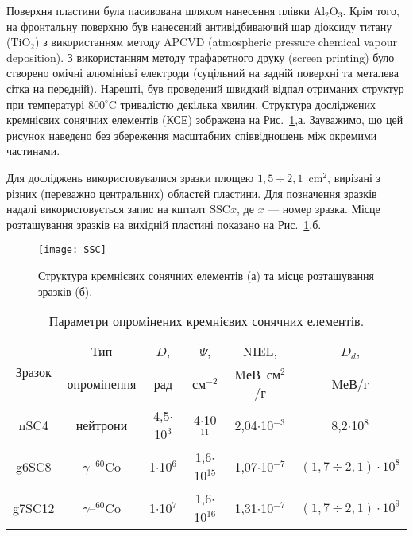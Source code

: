 Поверхня пластини була пасивована шляхом нанесення плівки Al$_2$O$_3$.
Крім того, на фронтальну поверхню був нанесений антивідбиваючий шар діоксиду титану (TiO$_2$) з використанням методу APCVD (atmospheric pressure chemical  vapour  deposition).
З використанням методу трафаретного друку (screen printing) було створено омічні алюмінієві електроди (суцільний на задній поверхні та металева сітка на передній).
Нарешті, був проведений швидкий відпал отриманих структур при температурі $800^\circ$C тривалістю декілька хвилин.
Структура досліджених кремнієвих сонячних елементів (КСЕ) зображена на Рис.~\ref{figSSC},а.
Зауважимо, що цей рисунок наведено без збереження масштабних співвідношень між окремими частинами.

Для досліджень використовувалися зразки площею $1,5\div2,1$~cm$^{2}$, вирізані з різних (переважно центральних) областей пластини.
Для позначення зразків надалі використовується запис на кшталт SSC$x$, де $x$ --- номер зразка.
Місце розташування зразків на вихідній пластині показано на Рис.~\ref{figSSC},б.


\begin{figure}
\center
\texttt{[image: SSC]}%
\caption{\label{figSSC}
Структура кремнієвих сонячних елементів (а) та місце розташування зразків (б).
}
\end{figure}


\begin{table}[b]
\caption{\label{tabSSCSample}Параметри опромінених кремнієвих сонячних елементів.
}
\begin{tabular}{|c|c|c|c|c|c|}
\hline
\multirow{2}{*}{Зразок} &Тип&$D$,&$\Psi$, &NIEL,& $D_d$,  \\
&опромінення& рад& см$^{-2}$&MеВ~см$^2$/г& MеВ/г \\
\hline
nSC4&нейтрони&4,5$\cdot$10$^3$&4$\cdot$10$^{11}$&2,04$\cdot$10$^{-3}$&8,2$\cdot$10$^{8}$\\ \hline
g6SC8&$\gamma$--$^{60}$Co&1$\cdot$10$^6$&1,6$\cdot$10$^{15}$&1,07$\cdot$10$^{-7}$\cite{NIEL:Akkerman}&$(1,7\div2,1)\cdot 10^{8}$\\
\cline{1-4}
\cline{6-6}
g7SC12&$\gamma$--$^{60}$Co&1$\cdot$10$^7$&1,6$\cdot$10$^{16}$&1,31$\cdot$10$^{-7}$\cite{NIEL:Messenger}&$(1,7\div2,1)\cdot 10^9$\\ \hline
\end{tabular}
\end{table}

